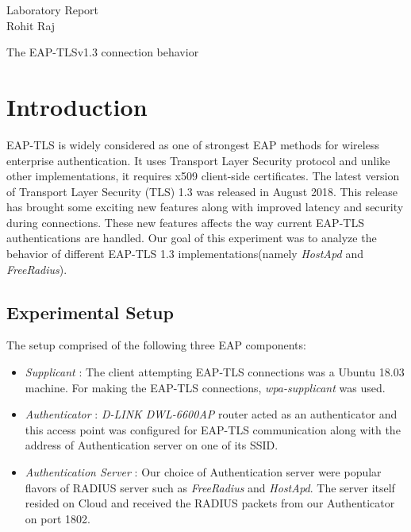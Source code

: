 \documentclass[12pt]{article}
\begin{document}

\begin{center}
    Laboratory Report \\
    Rohit Raj
\end{center}

\begin{center}
    \Large The EAP-TLSv1.3 connection behavior
\end{center}

\section{Introduction}
EAP-TLS is widely considered as one of strongest EAP methods for wireless enterprise authentication. It uses Transport Layer Security protocol and unlike other implementations, it requires x509 client-side certificates. The latest version of Transport Layer Security (TLS) 1.3 was released in August 2018. This release has brought some exciting new features along with improved latency and security during connections.  These new features affects the way current EAP-TLS authentications are handled. Our goal of this experiment was to analyze the behavior of different EAP-TLS 1.3 implementations(namely \emph{HostApd} and \emph{FreeRadius}).

\subsection{Experimental Setup}
The setup comprised of the following three EAP components:  


\begin{itemize}
	\item \emph{Supplicant} : The client attempting EAP-TLS connections was a Ubuntu 18.03 machine. For making the EAP-TLS connections, \emph{wpa-supplicant} was used. 
	\item \emph{Authenticator} : \emph{D-LINK DWL-6600AP} router acted as an authenticator and this access point was configured for EAP-TLS communication along with the address of Authentication server on one of its SSID. 
	\item \emph{Authentication Server} : Our choice of Authentication server were popular flavors of RADIUS server such as \emph{FreeRadius} and \emph{HostApd}. The server itself resided on Cloud and received the RADIUS packets from our Authenticator on port 1802.     
\end{itemize}
\end{document}
